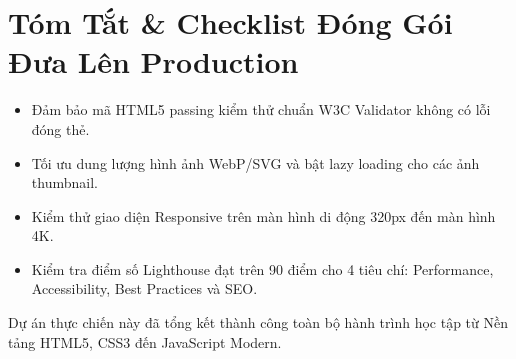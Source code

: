 \section{Tóm Tắt \& Checklist Đóng Gói Đưa Lên Production}

\begin{itemize}[leftmargin=1.5em, itemsep=4pt]
    \item Đảm bảo mã HTML5 passing kiểm thử chuẩn W3C Validator không có lỗi đóng thẻ.
    \item Tối ưu dung lượng hình ảnh WebP/SVG và bật lazy loading cho các ảnh thumbnail.
    \item Kiểm thử giao diện Responsive trên màn hình di động 320px đến màn hình 4K.
    \item Kiểm tra điểm số Lighthouse đạt trên 90 điểm cho 4 tiêu chí: Performance, Accessibility, Best Practices và SEO.
\end{itemize}

Dự án thực chiến này đã tổng kết thành công toàn bộ hành trình học tập từ Nền tảng HTML5, CSS3 đến JavaScript Modern.
